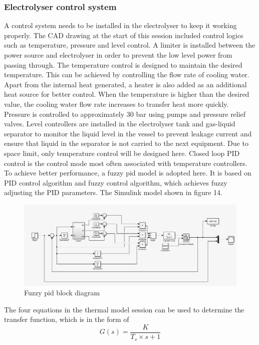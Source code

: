 \subsubsection{Electrolyser control system}
A control system needs to be installed in the electrolyser to keep it working properly. The CAD drawing at the start of this session included control logics such as temperature, pressure and level control.  A limiter is installed between the power source and electrolyser in order to prevent the low level power from passing through. The temperature control is designed to maintain the desired temperature. This can be achieved by controlling the flow rate of cooling water. Apart from the internal heat generated, a heater is also added as an additional heat source for better control. When the temperature is higher than the desired value, the cooling water flow rate increases to transfer heat more quickly.  Pressure is controlled to approximately 30 bar using pumps and pressure relief valves. Level controllers are installed in the electrolyser tank and gas-liquid separator to monitor the liquid level in the vessel to prevent leakage current and ensure that liquid in the separator is not carried to the next equipment. Due to space limit, only temperature control will be designed here. Closed loop PID control is the control mode most often associated with temperature controllers.\cite{control} To achieve better performance, a fuzzy pid model\cite{fuzzy} is adopted here. It is based on PID control algorithm and fuzzy control algorithm, which achieves fuzzy adjusting the PID parameters. The Simulink model shown in figure 14. 
\begin{figure}[H]
\includegraphics[with=10cm]{fuzzypid.png}
\caption{Fuzzy pid block diagram}
\end{figure}
The four equations in the thermal model session can be used to determine the transfer function, which is in the form of 
\begin{equation}
G(s) = \frac{K}{T_s\times s +1} 
\end{equation}
